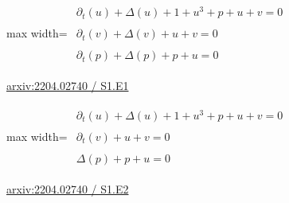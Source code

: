 \documentclass[10pt,a4paper]{article}
\begin{document}
\begin{minipage}{\linewidth}
\begin{center}\begin{adjustbox}{max width=\linewidth}$\displaystyle\begin{gathered}\begin{gathered}\partial_{t}(u)+\Delta(u)+1+u^{3}+p+u+v=0\end{gathered}\\[5pt]\begin{gathered}\partial_{t}(v)+\Delta(v)+u+v=0\end{gathered}\\[5pt]\begin{gathered}\partial_{t}(p)+\Delta(p)+p+u=0\end{gathered}\end{gathered}$\end{adjustbox}\end{center}
{\small \href{https://arxiv.org/html/2204.02740#S1.E1}{arxiv:2204.02740 / S1.E1}}\par
\end{minipage}\par\vspace{7mm}

\begin{minipage}{\linewidth}
\begin{center}\begin{adjustbox}{max width=\linewidth}$\displaystyle\begin{gathered}\begin{gathered}\partial_{t}(u)+\Delta(u)+1+u^{3}+p+u+v=0\end{gathered}\\[5pt]\begin{gathered}\partial_{t}(v)+u+v=0\end{gathered}\\[5pt]\begin{gathered}\Delta(p)+p+u=0\end{gathered}\end{gathered}$\end{adjustbox}\end{center}
{\small \href{https://arxiv.org/html/2204.02740#S1.E2}{arxiv:2204.02740 / S1.E2}}\par
\end{minipage}\par\vspace{7mm}
\end{document}
